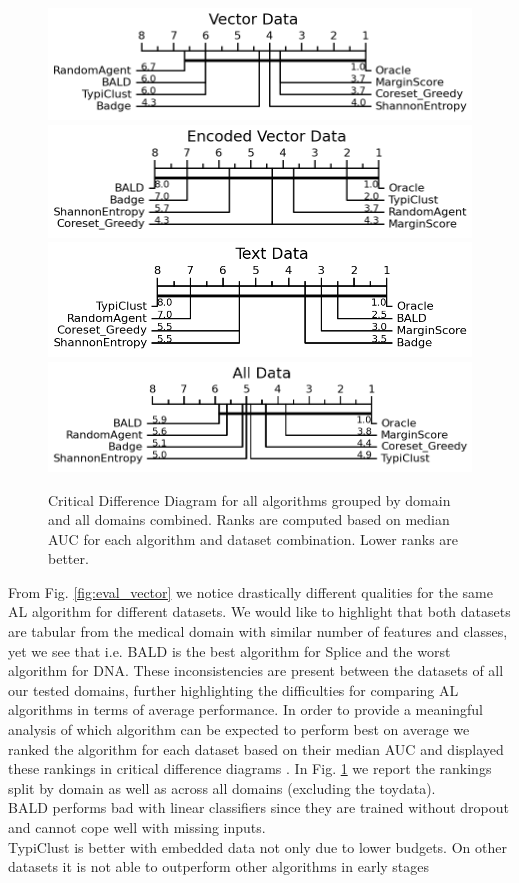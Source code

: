 \documentclass[]{article}
\begin{document}
\begin{figure}
\centering
	\includegraphics[width=0.49\linewidth]{img/vector.png}
	\includegraphics[width=0.49\linewidth]{img/vector_enc.png}
	\includegraphics[width=0.49\linewidth]{img/text.png}
	\includegraphics[width=0.49\linewidth]{img/all_data.png}
	\caption{Critical Difference Diagram for all algorithms grouped by domain and all domains combined. Ranks are computed based on median AUC for each algorithm and dataset combination. Lower ranks are better.}
	\label{fig:cd_diagrams}
\end{figure}
%
From Fig. \ref{fig:eval_vector} we notice drastically different qualities for the same AL algorithm for different datasets.
We would like to highlight that both datasets are tabular from the medical domain with similar number of features and classes, yet we see that i.e. BALD is the best algorithm for Splice and the worst algorithm for DNA.
These inconsistencies are present between the datasets of all our tested domains, further highlighting the difficulties for comparing AL algorithms in terms of average performance.
In order to provide a meaningful analysis of which algorithm can be expected to perform best on average we ranked the algorithm for each dataset based on their median AUC and displayed these rankings in critical difference diagrams \cite{IsmailFawaz2018deep}.
In Fig. \ref{fig:cd_diagrams} we report the rankings split by domain as well as across all domains (excluding the toydata). \\ [2mm]
%
BALD performs bad with linear classifiers since they are trained without dropout and cannot cope well with missing inputs. \\
TypiClust is better with embedded data not only due to lower budgets. On other datasets it is not able to outperform other algorithms in early stages
\end{document}
